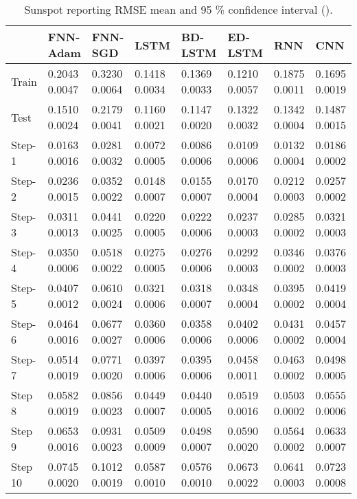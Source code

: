 \documentclass[final,5p,times,twocolumn]{elsarticle}
\begin{document}
\begin{table*}[htbp]
 \small 
\begin{tabular}{llllllll}
\hline
 &  FNN-Adam& FNN-SGD & LSTM & BD-LSTM  & ED-LSTM & RNN & CNN\\
\hline
\hline
							
Train &      
0.2043	0.0047&
0.3230	0.0064&
0.1418	0.0034&
0.1369	0.0033&
0.1210	0.0057&
0.1875	0.0011&0.1695	0.0019\\
Test &      
0.1510	0.0024&
0.2179	0.0041&
0.1160	0.0021&
0.1147	0.0020&
0.1322	0.0032&
0.1342	0.0004&0.1487	0.0015\\
Step-1 &      
0.0163	0.0016&
0.0281	0.0032&
0.0072	0.0005&
0.0086	0.0006&
0.0109	0.0006&
0.0132	0.0004&0.0186	0.0002\\
Step-2 &      
0.0236	0.0015&
0.0352	0.0022&
0.0148	0.0007&
0.0155	0.0007&
0.0170	0.0004&
0.0212	0.0003&0.0257	0.0002\\
Step-3 &      
0.0311	0.0013&
0.0441	0.0025&
0.0220	0.0005&
0.0222	0.0006&
0.0237	0.0003&
0.0285	0.0002&0.0321	0.0003\\
Step-4 &      
0.0350	0.0006&
0.0518	0.0022&
0.0275	0.0005&
0.0276	0.0006&
0.0292	0.0003&
0.0346	0.0002&0.0376	0.0003\\
Step-5 &      
0.0407	0.0012&
0.0610	0.0024&
0.0321	0.0006&
0.0318	0.0007&
0.0348	0.0004&
0.0395	0.0002&	0.0419	0.0004\\
Step-6 &      
0.0464	0.0016&
0.0677	0.0027&
0.0360	0.0006&
0.0358	0.0006&
0.0402	0.0006&
0.0431	0.0002&0.0457	0.0004\\
Step-7 &      
0.0514	0.0019&
0.0771	0.0020&
0.0397	0.0006&
0.0395	0.0006&
0.0458	0.0011&
0.0463	0.0002&	0.0498	0.0005\\
Step 8 &      
0.0582	0.0019&
0.0856	0.0023&
0.0449	0.0007&
0.0440	0.0005&
0.0519	0.0016&
0.0503	0.0002&0.0555	0.0006\\
Step 9 &      
0.0653	0.0016&
0.0931	0.0023&
0.0509	0.0009&
0.0498	0.0007&
0.0590	0.0020&
0.0564	0.0002&	0.0633	0.0007\\
Step 10 &      
0.0745	0.0020&
0.1012	0.0019&
0.0587	0.0010&
0.0576	0.0010&
0.0673	0.0022&
0.0641	0.0003&	0.0723	0.0008\\
\hline
 
\end{tabular}
\caption{Sunspot reporting RMSE mean and 95 \% confidence interval   ().}
\label{tab:sunspot}
\end{table*}
\end{document}
